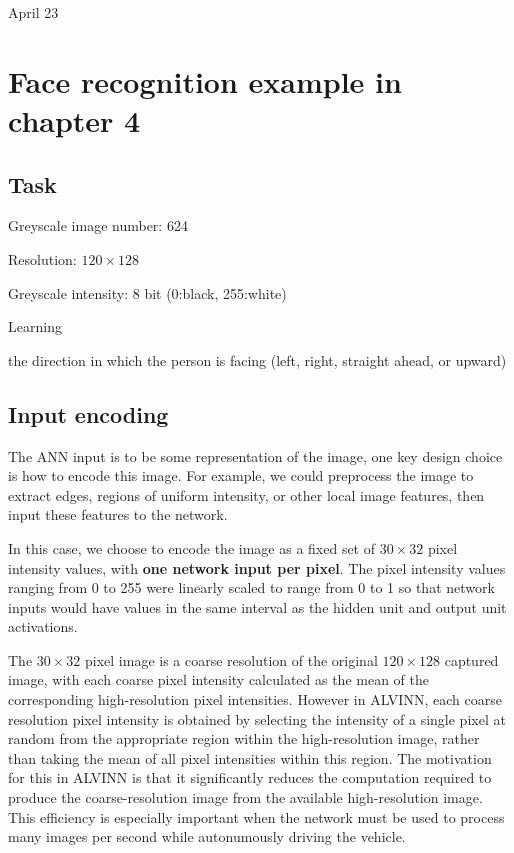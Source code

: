 \univlogo

{\Huge April 23}\vspace{5mm}

\section*{Face recognition example in chapter 4}

\subsection*{Task}

Greyscale image number: 624

Resolution: $120 \times 128$

Greyscale intensity: 8 bit (0:black, 255:white)

\begin{LARGE}Learning\end{LARGE} the direction in which the person is facing (left, right, straight ahead, or upward)

\subsection*{Input encoding}

The ANN input is to be some representation of the image, one key design choice is how to encode this image. For example, we could preprocess the image to extract edges, regions of uniform intensity, or other local image features, then input these features to the network.

In this case, we choose to encode the image as a fixed set of $30 \times 32$ pixel intensity values, with \textbf{one network input per pixel}. The pixel intensity values ranging from 0 to 255 were linearly scaled to range from 0 to 1 so that network inputs would have values in the same interval as the hidden unit and output unit activations.

The $30 \times 32$ pixel image is a coarse resolution of the original $120 \times 128$ captured image, with each coarse pixel intensity calculated as the mean of the corresponding high-resolution pixel intensities. However in ALVINN, each coarse resolution pixel intensity is obtained by selecting the intensity of a single pixel at random from the appropriate region within the high-resolution image, rather than taking the mean of all pixel intensities within this region. The motivation for this in ALVINN is that it significantly reduces the computation required to produce the coarse-resolution image from the available high-resolution image. This efficiency is especially important when the network must be used to process many images per second while autonumously driving the vehicle.

